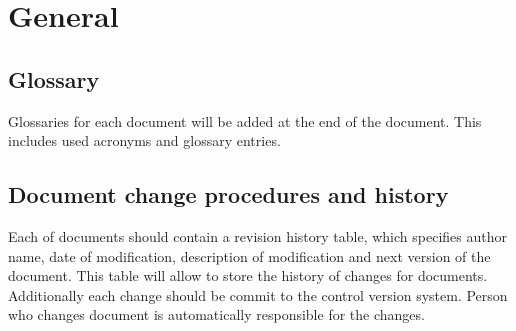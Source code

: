 		\chapter{General} \label{chp:general}
	\begin{comment}
		Introduce the following subordinate sections. This section includes the Glossary and document change
		procedures.
	\end{comment}

\section{Glossary} \label{s:general:glossary}
	\begin{comment}
		Provide an alphabetical list of terms that may require definition for the users of the MTP with their
		corresponding definitions. This includes acronyms. There may also be a reference to a project glossary,
		possibly posted online.
	\end{comment}
	Glossaries for each document will be added at the end of the document. This includes used acronyms and glossary entries.
\section{Document change procedures and history} \label{s:general:document-change-procedures-and-history}
	\begin{comment}
		Specify the means for identifying, approving, implementing, and recording changes to the MTP. This
		may be recorded in an overall configuration management system that is documented in a Configuration
		Management Plan that is referenced here. The change procedures need to include a log of all of the
		changes that have occurred since the inception of the MTP. This may include a Document ID (every
		testing document should have a unique ID connected to the system project), version number
		(sequential starting with first approved version), description of document changes, reason for changes
		(e.g., audit comments, team review, system changes), name of person making changes, and role of
		person to document (e.g., document author, project manager, system owner). This information is
		commonly put on an early page in the document (after the title page and before Section 1). Some
		organizations put this information at the end of the document.
	\end{comment}
	Each of documents should contain a revision history table, which specifies author name,
	date of modification, description of modification and next version of the document.
	This table will allow to store the history of changes for documents. Additionally each
	change should be commit to the control version system. Person who changes document
	is automatically responsible for the changes.